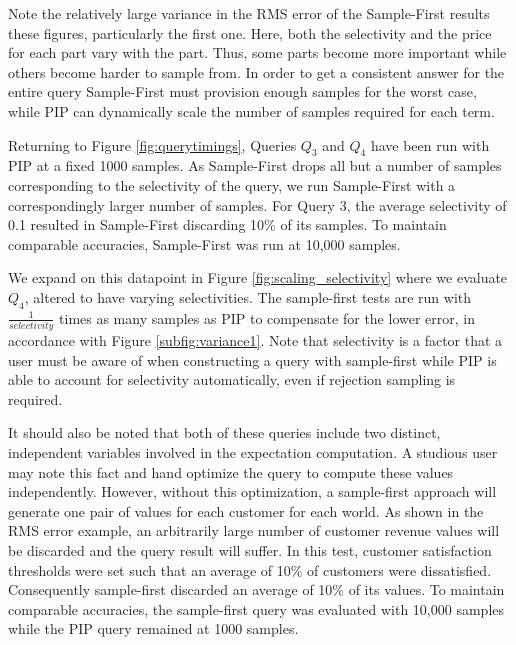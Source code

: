 Note the relatively large variance in the RMS error of the Sample-First results these figures, particularly the first one.  Here, both the selectivity and the price for each part vary with the part.   Thus, some parts become more important while others become harder to sample from.  In order to get a consistent answer for the entire query Sample-First must provision enough samples for the worst case, while PIP can dynamically scale the number of samples required for each term.

Returning to Figure \ref{fig:querytimings}, Queries $Q_3$ and $Q_4$ have been run with PIP at a fixed 1000 samples.  As Sample-First drops all but a number of samples corresponding to the selectivity of the query, we run Sample-First with a correspondingly larger number of samples.  For Query 3, the average selectivity of 0.1 resulted in Sample-First discarding 10\% of its samples.  To maintain comparable accuracies, Sample-First was run at 10,000 samples.  

We expand on this datapoint in Figure \ref{fig:scaling_selectivity} where we evaluate $Q_4$, altered to have varying selectivities.  The sample-first tests are run with $\frac{1}{selectivity}$ times as many samples as PIP to compensate for the lower error, in accordance with Figure \ref{subfig:variance1}.  Note that selectivity is a factor that a user must be aware of when constructing a query with sample-first while PIP is able to account for selectivity automatically, even if rejection sampling is required.

It should also be noted that both of these queries include two distinct, independent variables involved in the expectation computation.  A studious user may note this fact and hand optimize the query to compute these values independently.  However, without this optimization, a sample-first approach will generate one pair of values for each customer for each world.  As shown in the RMS error example, an arbitrarily large number of customer revenue values will be discarded and the query result will suffer.  In this test, customer satisfaction thresholds were set such that an average of 10\% of customers were dissatisfied.  Consequently sample-first discarded an average of 10\% of its values.  To maintain comparable accuracies, the sample-first query was evaluated with 10,000 samples while the PIP query remained at 1000 samples. 


